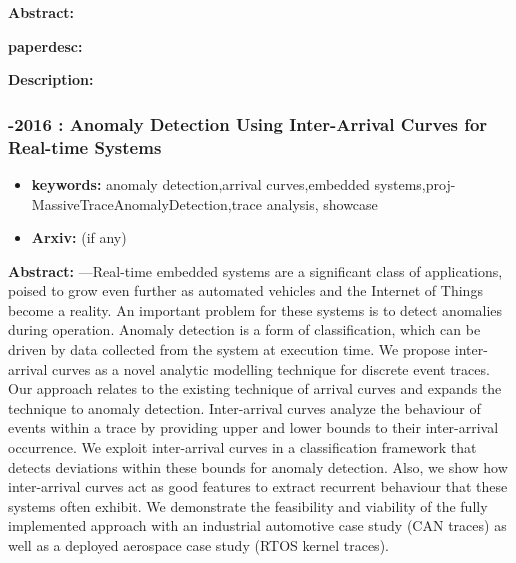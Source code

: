 \documentclass{article}
\begin{document}

\textbf{Abstract:} 

\textbf{paperdesc:} 

\textbf{Description:} 



\newpage
\subsubsection{\textbf{-2016} : Anomaly Detection Using Inter-Arrival Curves for Real-time Systems}
\begin{itemize}
\item \textbf{keywords:} anomaly detection,arrival curves,embedded systems,proj-MassiveTraceAnomalyDetection,trace analysis, showcase
\item \textbf{Arxiv:}  (if any)
\end{itemize}


\textbf{Abstract:} ---Real-time embedded systems are a significant class of applications, poised to grow even further as automated vehicles and the Internet of Things become a reality. An important problem for these systems is to detect anomalies during operation. Anomaly detection is a form of classification, which can be driven by data collected from the system at execution time. We propose inter-arrival curves as a novel analytic modelling technique for discrete event traces. Our approach relates to the existing technique of arrival curves and expands the technique to anomaly detection. Inter-arrival curves analyze the behaviour of events within a trace by providing upper and lower bounds to their inter-arrival occurrence. We exploit inter-arrival curves in a classification framework that detects deviations within these bounds for anomaly detection. Also, we show how inter-arrival curves act as good features to extract recurrent behaviour that these systems often exhibit. We demonstrate the feasibility and viability of the fully implemented approach with an industrial automotive case study (CAN traces) as well as a deployed aerospace case study (RTOS kernel traces).
\end{document}

